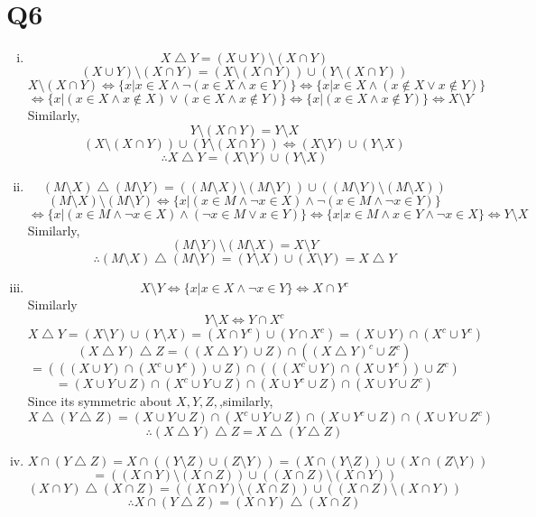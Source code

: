 \documentclass[12pt]{article}
\begin{document}
\section{Q6}
\begin{enumerate}[(i)]
\item
$$X\bigtriangleup Y=(X\cup Y)\setminus (X\cap Y)$$
$$(X\cup Y)\setminus (X\cap Y)=(X\setminus  (X\cap Y ))\cup (Y\setminus (X\cap Y))$$
$$X\setminus  (X\cap Y )\Leftrightarrow\{x|x\in X\wedge\neg(x \in X\wedge x \in Y)\}\Leftrightarrow\{x|x\in X\wedge (x \notin X\vee x \notin Y)\}$$
$$\Leftrightarrow\{x|(x\in X\wedge x\notin X)\vee (x\in X\wedge x\notin Y)\}\Leftrightarrow\{x|(x\in X\wedge x\notin Y)\}\Leftrightarrow X\setminus Y$$
Similarly,$$Y\setminus (X\cap Y)=Y\setminus X$$
$$(X\setminus  (X\cap Y ))\cup (Y\setminus (X\cap Y))\Leftrightarrow(X\setminus Y)\cup (Y\setminus X)$$
$$\therefore X\bigtriangleup Y=(X\setminus Y)\cup (Y\setminus X) $$
\item
$$(M\setminus X)\bigtriangleup(M\setminus Y)=((M\setminus X)\setminus (M\setminus Y))\cup ((M\setminus Y)\setminus (M\setminus X))$$
$$(M\setminus X)\setminus (M\setminus Y)\Leftrightarrow\{x|(x\in M\wedge \neg x\in X)\wedge\neg(x\in M\wedge \neg x\in Y)\}$$
$$\Leftrightarrow\{x|(x\in M\wedge \neg x\in X)\wedge(\neg x\in M\vee x\in Y)\}\Leftrightarrow\{x|x\in M\wedge x\in Y\wedge \neg x\in X\}\Leftrightarrow Y\setminus X$$
Similarly,$$(M\setminus Y)\setminus (M\setminus X)=X\setminus Y$$
$$\therefore (M\setminus X)\bigtriangleup(M\setminus Y)=(Y\setminus X)\cup (X\setminus Y)=X\bigtriangleup Y$$
\item 
$$X\setminus Y\Leftrightarrow\{x|x\in X\wedge\neg x\in Y\}\Leftrightarrow X\cap Y^c$$
Similarly $$Y\setminus X\Leftrightarrow Y\cap X^c$$
$$ X\bigtriangleup Y=(X\setminus Y)\cup (Y\setminus X)=(X\cap Y^c)\cup(Y\cap X^c)=(X\cup Y)\cap(X^c\cup Y^c) $$
$$(X\bigtriangleup Y)\bigtriangleup Z=((X\bigtriangleup Y)\cup Z)\cap((X\bigtriangleup Y)^c\cup Z^c) $$
$$=(((X\cup Y)\cap(X^c\cup Y^c))\cup Z)\cap(((X^c\cup Y)\cap(X\cup Y^c))\cup Z^c)$$
$$=(X\cup Y \cup Z)\cap(X^c\cup Y \cup Z)\cap(X\cup Y^c \cup Z)\cap(X\cup Y \cup Z^c)$$
Since its symmetric about $X,Y,Z,$,similarly,
$$X\bigtriangleup(Y\bigtriangleup Z)=(X\cup Y \cup Z)\cap(X^c\cup Y \cup Z)\cap(X\cup Y^c \cup Z)\cap(X\cup Y \cup Z^c)$$
$$\therefore (X\bigtriangleup Y)\bigtriangleup Z=X\bigtriangleup(Y\bigtriangleup Z)$$ 
\item
$$X\cap(Y\bigtriangleup Z)=X\cap((Y\setminus Z)\cup(Z\setminus Y))=(X\cap(Y\setminus Z))\cup(X\cap(Z\setminus Y))$$
$$=((X\cap Y)\setminus(X\cap Z))\cup((X\cap Z)\setminus(X\cap Y))$$
$$(X\cap Y)\bigtriangleup(X\cap Z)=((X\cap Y)\setminus(X\cap Z))\cup((X\cap Z)\setminus(X\cap Y))$$
$$\therefore X\cap(Y\bigtriangleup Z)=(X\cap Y)\bigtriangleup(X\cap Z)$$
\end{enumerate}
\end{document}
